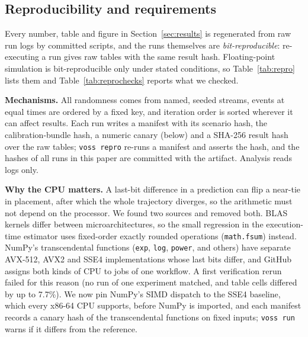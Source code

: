 \subsection{Reproducibility and requirements}
\label{sec:repro}
Every number, table and figure in Section~\ref{sec:results} is regenerated from raw run logs by committed scripts, and the runs themselves are
\emph{bit-reproducible}: re-executing a run gives raw tables with the same result hash. Floating-point simulation is bit-reproducible only under stated
conditions, so Table~\ref{tab:repro} lists them and Table~\ref{tab:reprochecks} reports what we checked.

\textbf{Mechanisms.} All randomness comes from named, seeded streams, events at equal times are ordered by a fixed key, and iteration order is sorted wherever
it can affect results. Each run writes a manifest with its scenario hash, the calibration-bundle hash, a numeric canary (below) and a SHA-256 result hash over the raw
tables; \texttt{voss repro} re-runs a manifest and asserts the hash, and the hashes of all runs in this paper are committed with the artifact. Analysis reads logs only.

\textbf{Why the CPU matters.} A last-bit difference in a prediction can flip a near-tie in placement, after which the whole trajectory diverges, so the arithmetic must not
depend on the processor. We found two sources and removed both. BLAS kernels differ between microarchitectures, so the small regression in the execution-time estimator uses fixed-order
exactly rounded operations (\texttt{math.fsum}) instead. NumPy's transcendental functions (\texttt{exp}, \texttt{log}, \texttt{power}, and others) have separate AVX-512, AVX2 and SSE4
implementations whose last bits differ, and GitHub assigns both kinds of CPU to jobs of one workflow. A first verification rerun failed for this reason (no run of one experiment matched,
and table cells differed by up to 7.7\%). We now pin NumPy's SIMD dispatch to the SSE4 baseline, which every x86-64 CPU supports, before NumPy is imported, and each manifest
records a canary hash of the transcendental functions on fixed inputs; \texttt{voss run} warns if it differs from the reference.

